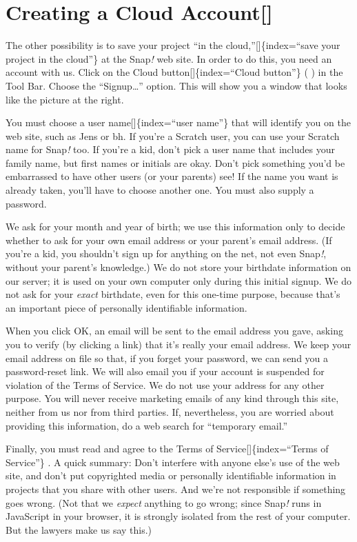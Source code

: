 \documentclass[
  letterpaper,
]{book}
\begin{document}
\section{Creating a Cloud Account{[}{]}}\label{creating-a-cloud-account}

The other possibility is to save your project ``in the
cloud,''{[}{]}\{index=``save your project in the cloud''\} at the
Snap\emph{!} web site. In order to do this, you need an account with us.
Click on the Cloud button{[}{]}\{index=``Cloud button''\} ( ) in the
Tool Bar. Choose the ``Signup\ldots{}'' option. This will show you a
window that looks like the picture at the right.

You must choose a user name{[}{]}\{index=``user name''\} that will
identify you on the web site, such as Jens or bh. If you're a Scratch
user, you can use your Scratch name for Snap\emph{!} too. If you're a
kid, don't pick a user name that includes your family name, but first
names or initials are okay. Don't pick something you'd be embarrassed to
have other users (or your parents) see! If the name you want is already
taken, you'll have to choose another one. You must also supply a
password.

We ask for your month and year of birth; we use this information only to
decide whether to ask for your own email address or your parent's email
address. (If you're a kid, you shouldn't sign up for anything on the
net, not even Snap\emph{!}, without your parent's knowledge.) We do not
store your birthdate information on our server; it is used on your own
computer only during this initial signup. We do not ask for your
\emph{exact} birthdate, even for this one-time purpose, because that's
an important piece of personally identifiable information.

When you click OK, an email will be sent to the email address you gave,
asking you to verify (by clicking a link) that it's really your email
address. We keep your email address on file so that, if you forget your
password, we can send you a password-reset link. We will also email you
if your account is suspended for violation of the Terms of Service. We
do not use your address for any other purpose. You will never receive
marketing emails of any kind through this site, neither from us nor from
third parties. If, nevertheless, you are worried about providing this
information, do a web search for ``temporary email.''

Finally, you must read and agree to the Terms of
Service{[}{]}\{index=``Terms of Service''\} . A quick summary: Don't
interfere with anyone else's use of the web site, and don't put
copyrighted media or personally identifiable information in projects
that you share with other users. And we're not responsible if something
goes wrong. (Not that we \emph{expect} anything to go wrong; since
Snap\emph{!} runs in JavaScript in your browser, it is strongly isolated
from the rest of your computer. But the lawyers make us say this.)
\end{document}
